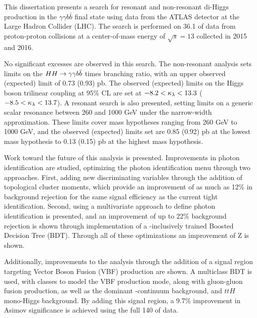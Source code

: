 This dissertation presents a search for resonant and non-resonant di-Higgs production in the $\gamma \gamma b \bar{b}$ final state using data from the ATLAS detector at the Large Hadron Collider (LHC).  The search is performed on 36.1 \ifb of data from proton-proton collisions at a center-of-mass energy of $\sqrt{s} = 13$ \TeV collected in 2015 and 2016.

No significant excesses are observed in this search. The non-resonant analysis sets limits on the $HH\rightarrow\gamma\gamma b\bar{b}$ \xsec times branching ratio, with an upper observed (expected) limit of 0.73 (0.93) pb. The observed (expected) limits on the Higgs boson trilinear coupling at 95\% \gls{CL} are set at $-8.2 < \kappa_{\lambda} < 13.3$ ($-8.5 < \kappa_{\lambda} < 13.7$). A resonant search is also presented, setting limits on a generic scalar resonance between 260 and 1000 GeV under the narrow-width approximation. These  limits cover mass hypotheses ranging from 260 GeV to 1000 GeV, and the observed (expected) limits set are 0.85 (0.92) pb at the lowest mass hypothesis to 0.13 (0.15) pb at the highest mass hypothesis.

Work toward the future of this analysis is presented. Improvements in photon identification are studied, optimizing the photon identification menu through two approaches. First, adding new discriminating variables through the addition of topological cluster moments, which provide an improvement of as much as 12\% in background rejection for the same signal efficiency as the current tight identification. Second, using a multivariate approach to define photon identification is presented, and an improvement of up to 22\% background rejection is shown through implementation of a \pt-inclusively trained Boosted Decision Tree (BDT). Through all of these optimizations an improvement of Z is shown.

Additionally, improvements to the analysis through the addition of a signal region targeting Vector Boson Fusion (VBF) production are shown. A multiclass BDT is used, with classes to model the VBF \hh production mode, along with gluon-gluon fusion \hh production, as well as the dominant \yy-continuum background, and $ttH$ mono-Higgs background. By adding this signal region, a 9.7\% improvement in Asimov significance is achieved using the full 140 \ifb of \RunTwo data. 